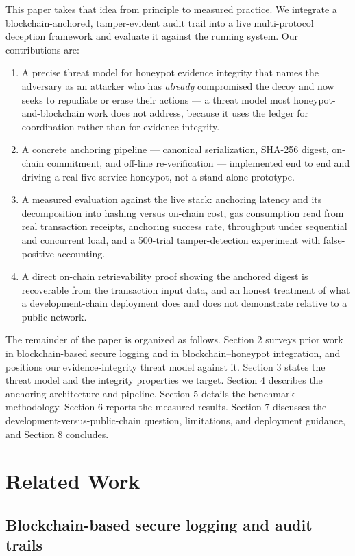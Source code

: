 \documentclass[conference]{IEEEtran}
\begin{document}
This paper takes that idea from principle to measured practice. We integrate a blockchain-anchored, tamper-evident audit trail into a live multi-protocol deception framework and evaluate it against the running system. Our contributions are:

\begin{enumerate}
\item A precise threat model for honeypot evidence integrity that names the adversary as an attacker who has \emph{already} compromised the decoy and now seeks to repudiate or erase their actions --- a threat model most honeypot-and-blockchain work does not address, because it uses the ledger for coordination rather than for evidence integrity.
\item A concrete anchoring pipeline --- canonical serialization, SHA-256 digest, on-chain commitment, and off-line re-verification --- implemented end to end and driving a real five-service honeypot, not a stand-alone prototype.
\item A measured evaluation against the live stack: anchoring latency and its decomposition into hashing versus on-chain cost, gas consumption read from real transaction receipts, anchoring success rate, throughput under sequential and concurrent load, and a 500-trial tamper-detection experiment with false-positive accounting.
\item A direct on-chain retrievability proof showing the anchored digest is recoverable from the transaction input data, and an honest treatment of what a development-chain deployment does and does not demonstrate relative to a public network.
\end{enumerate}

The remainder of the paper is organized as follows. Section 2 surveys prior work in blockchain-based secure logging and in blockchain--honeypot integration, and positions our evidence-integrity threat model against it. Section 3 states the threat model and the integrity properties we target. Section 4 describes the anchoring architecture and pipeline. Section 5 details the benchmark methodology. Section 6 reports the measured results. Section 7 discusses the development-versus-public-chain question, limitations, and deployment guidance, and Section 8 concludes.

\section{Related Work}

\subsection{Blockchain-based secure logging and audit trails}
\end{document}
